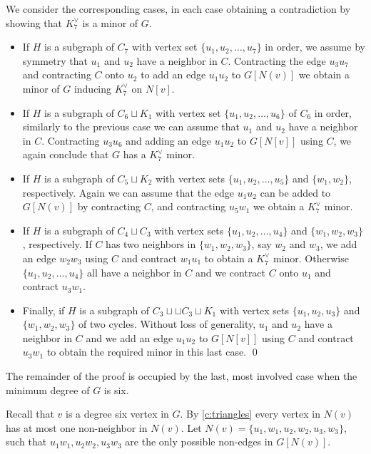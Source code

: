 \documentclass[reqno,final,12pt]{amsart}
\begin{document}
{ We consider the corresponding cases, in each case obtaining a contradiction by showing that $K^{\vee}_7$ is a minor of $G$.
 \begin{itemize}
 	\item
 If $H$ is a subgraph of $C_7$ with vertex set $\{u_1,u_2,\ldots,u_7\}$ in order, we assume by symmetry that $u_1$ and $u_2$ have a neighbor in $C$. Contracting the edge $u_3u_7$ and contracting $C$ onto $u_2$ to add an edge $u_1u_2$ to $G[N(v)]$ we obtain a minor of $G$ inducing $K^{\vee}_7$ on $N[v]$.
 \item   If $H$ is a subgraph of $C_6 \sqcup K_1$ with vertex set $\{u_1,u_2,\ldots,u_6\}$ of $C_6$ in order, similarly to the previous case we can assume that $u_1$ and $u_2$ have a neighbor in $C$.  Contracting  $u_3u_6$ and   adding an edge $u_1u_2$ to $G[N[v]]$ using $C$, we again conclude that  $G$ has a $K^{\vee}_7$ minor.
 \item   If $H$ is a subgraph of $C_5 \sqcup K_2$ with vertex sets $\{u_1,u_2,\ldots,u_5\}$ and $\{w_1,w_2\}$, respectively. Again we can assume that the edge $u_1u_2$ can be added to $G[N(v)]$ by contracting $C$, and contracting $u_5w_1$ we obtain a $K^{\vee}_7$ minor.
 \item   If $H$ is a subgraph of $C_4 \sqcup C_3$ with vertex sets $\{u_1,u_2,\ldots,u_4\}$ and $\{w_1,w_2,w_3\}$, respectively.  If $C$ has two neighbors in $\{w_1,w_2,w_3\}$, say $w_2$ and $w_3$, we add an edge $w_2w_3$ using $C$ and contract $w_1u_1$ to obtain a    $K^{\vee}_7$ minor. Otherwise $\{u_1,u_2,\ldots,u_4\}$ all have a neighbor in $C$ and we contract $C$ onto $u_1$ and contract $u_3w_1$. 
 \item  Finally, if $H$ is a subgraph of $C_3 \sqcup  \sqcup C_3 \sqcup K_1$ with vertex sets $\{u_1,u_2,u_3\}$ and $\{w_1,w_2,w_3\}$ of two cycles. Without loss of generality, $u_1$ and $u_2$ have a neighbor in $C$ and we add an edge $u_1u_2$ to $G[N[v]] $ using $C$ and contract $u_3w_1$ to obtain the required minor in this last case. \qed
 \end{itemize}  
\vskip 5pt
	
The remainder of the proof is occupied by the last, most involved case when the minimum degree of $G$ is six.

Recall that $v$ is a degree six vertex in $G$. By \cref{c:triangles} every vertex in $N(v)$ has at most one non-neighbor in $N(v)$.
Let $N(v)= \{u_1,w_1,u_2,w_2,u_3,w_3\}$, such that $u_1w_1,u_2w_2,u_3w_3$ are the only possible non-edges in $G[N(v)]$.
 
}
\end{document}
